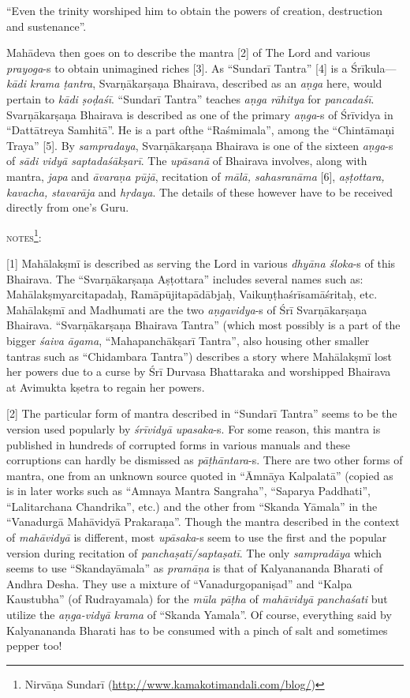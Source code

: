 \documentclass[11pt,oneside,a4paper]{article}
\newcommand{\tl}[1]{\emph{#1}}
\begin{document}
``Even the trinity worshiped him to obtain the powers of creation, destruction
and sustenance''.

Mahādeva then goes on to describe the mantra [2] of The Lord and various
\tl{prayoga}-s to obtain unimagined riches [3]. As ``Sundarī Tantra'' [4] is
a Śrīkula---\tl{kādi krama ṭantra}, Svarṇākarṣaṇa Bhairava, described as
an \tl{aṇga} here, would pertain to \tl{kādi ṣoḍaśī}. ``Sundarī Tantra'' teaches
\tl{aṇga rāhitya} for \tl{pancadaśī}. Svarṇākarṣaṇa Bhairava is described as
one of the primary \tl{aṇga}-s of Śrīvidya in ``Dattātreya Samhitā''. He is
a part ofthe ``Raśmimala'', among the ``Chintāmaṇi Traya'' [5]. By
\tl{sampradaya}, Svarṇākarṣaṇa Bhairava is one of the sixteen \tl{aṇga}-s of
\tl{sādi vidyā saptadaśākṣarī}. The \tl{upāsanā} of Bhairava involves, along
with mantra, \tl{japa} and \tl{āvaraṇa pūjā}, recitation of \tl{mālā,
sahasranāma} [6], \tl{aṣṭottara, kavacha, stavarāja} and \tl{hṛdaya}.
The details of these however have to be received directly from one's Guru.

\textsc{notes}\footnote{Nirvāṇa Sundarī (\url{http://www.kamakotimandali.com/blog/})}:

[1] Mahālakṣmī is described as serving the Lord in various \tl{dhyāna śloka}-s
of this Bhairava. The ``Svarṇākarṣaṇa Aṣṭottara'' includes several names such
as: Mahālakṣmyarcitapadaḥ, Ramāpūjitapādābjaḥ, Vaikuṇṭhaśrīsamāśritaḥ, etc.
Mahālakṣmī and Madhumati are the two \tl{aṇgavidya}-s of Śrī Svarṇākarṣaṇa
Bhairava. ``Svarṇākarṣaṇa Bhairava Tantra'' (which most possibly is a part of
the bigger \tl{śaiva āgama}, ``Mahapanchākṣarī Tantra'', also housing other
smaller tantras such as ``Chidambara Tantra'') describes a story where
Mahālakṣmī lost her powers due to a curse by Śrī Durvasa Bhattaraka and
worshipped Bhairava at Avimukta kṣetra to regain her powers.

[2] The particular form of mantra described in ``Sundarī Tantra'' seems to be
the version used popularly by \tl{śrīvidyā upasaka}-s. For some reason, this
mantra is published in hundreds of corrupted forms in various manuals and these
corruptions can hardly be dismissed as \tl{pāṭhāntara}-s. There are two other
forms of mantra, one from an unknown source quoted in ``Āmnāya Kalpalatā'' (copied
as is in later works such as ``Amnaya Mantra Sangraha'', ``Saparya Paddhati'',
``Lalitarchana Chandrika'', etc.) and the other from ``Skanda Yāmala'' in
the ``Vanadurgā Mahāvidyā Prakaraṇa''. Though the mantra described in the context of
\tl{mahāvidyā} is different, most \tl{upāsaka}-s seem to use the first and
the popular version during recitation of \tl{panchaṣatī/saptaṣatī}. The only
\tl{sampradāya} which seems to use ``Skandayāmala'' as \tl{pramāṇa} is that of
Kalyanananda Bharati of Andhra Desha. They use a mixture of ``Vanadurgopaniṣad''
and ``Kalpa Kaustubha'' (of Rudrayamala) for the \tl{mūla pāṭha} of \tl{mahāvidyā
panchaśati} but utilize the \tl{aṇga-vidyā krama} of ``Skanda Yamala''. Of course,
everything said by Kalyanananda Bharati has to be consumed with a pinch of salt
and sometimes pepper too!
\end{document}
